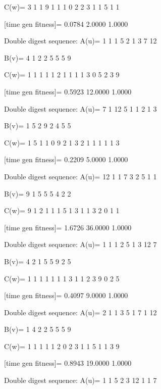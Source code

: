 C(w)=
     3     1     1     9     1     1     1     0     2     2     3     1     1     5     1     1

[time gen fitness]=
    0.0784    2.0000    1.0000

Double digest sequence:
A(u)=
     1     1     1     5     2     1     3     7    12

B(v)=
     4     1     2     2     5     5     5     9

C(w)=
     1     1     1     1     1     2     1     1     1     1     3     0     5     2     3     9

[time gen fitness]=
    0.5923   12.0000    1.0000

Double digest sequence:
A(u)=
     7     1    12     5     1     1     2     1     3

B(v)=
     1     5     2     9     2     4     5     5

C(w)=
     1     5     1     1     0     9     2     1     3     2     1     1     1     1     1     3

[time gen fitness]=
    0.2209    5.0000    1.0000

Double digest sequence:
A(u)=
    12     1     1     7     3     2     5     1     1

B(v)=
     9     1     5     5     5     4     2     2

C(w)=
     9     1     2     1     1     1     5     1     3     1     1     3     2     0     1     1

[time gen fitness]=
    1.6726   36.0000    1.0000

Double digest sequence:
A(u)=
     1     1     1     2     5     1     3    12     7

B(v)=
     4     2     1     5     5     9     2     5

C(w)=
     1     1     1     1     1     1     1     3     1     1     2     3     9     0     2     5

[time gen fitness]=
    0.4097    9.0000    1.0000

Double digest sequence:
A(u)=
     2     1     1     3     5     1     7     1    12

B(v)=
     1     4     2     2     5     5     5     9

C(w)=
     1     1     1     1     1     2     0     2     3     1     1     5     1     1     3     9

[time gen fitness]=
    0.8943   19.0000    1.0000

Double digest sequence:
A(u)=
     1     1     5     2     3    12     1     1     7

